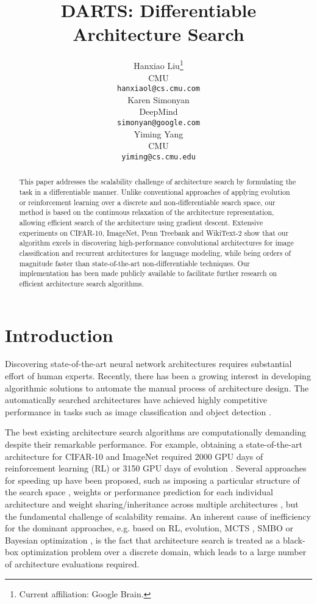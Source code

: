 \documentclass{article}
\title{DARTS: Differentiable Architecture Search}
\author{Hanxiao Liu\thanks{Current affiliation: Google Brain.} \\
  CMU \\
  \texttt{hanxiaol@cs.cmu.com} \\
  \And
  Karen Simonyan \\
  DeepMind \\
  \texttt{simonyan@google.com} \\
   \And
   Yiming Yang \\
   CMU \\
   \texttt{yiming@cs.cmu.edu}
}
\begin{document}
\maketitle

\begin{abstract}
	This paper addresses the scalability challenge of architecture search by formulating the task in a differentiable manner.
	Unlike conventional approaches of applying
	evolution or reinforcement learning over a discrete and non-differentiable search space,
	our method is based on the continuous relaxation of the architecture representation,
	allowing efficient search of the architecture using gradient descent.
	Extensive experiments on CIFAR-10, ImageNet, Penn Treebank and WikiText-2 show that
	our algorithm excels in 
	discovering high-performance convolutional architectures for image classification and recurrent architectures for language modeling,
	while being orders of magnitude faster than state-of-the-art non-differentiable techniques. Our implementation has been made publicly available to facilitate further research on efficient architecture search algorithms.
\end{abstract}

\section{Introduction}
Discovering state-of-the-art neural network architectures requires substantial effort of human experts.
Recently, there has been a growing interest in developing
algorithmic solutions
to automate the manual process of architecture design.
The automatically searched architectures have achieved highly competitive performance in tasks such as image classification \citep{zoph2016neural, zoph2017learning, liu2017hierarchical, liu2017progressive, real2018regularized} and object detection \citep{zoph2017learning}.

The best existing architecture search algorithms are computationally demanding
despite their remarkable performance.
For example,
obtaining a state-of-the-art architecture for CIFAR-10 and ImageNet
required 2000 GPU days of reinforcement learning (RL) \citep{zoph2017learning}
or 3150 GPU days of evolution \citep{real2018regularized}.
Several approaches for speeding up have been proposed,
such as imposing a particular structure of the search space \citep{liu2017hierarchical, liu2017progressive}, weights or performance prediction for each individual architecture \citep{brock2017smash, baker2018accelerating} and weight sharing/inheritance across multiple architectures \citep{elsken2017simple, pham2018efficient, cai2018efficient, bender2018understanding},
but the fundamental challenge of scalability remains.
An inherent cause of inefficiency for the dominant approaches,
e.g. based on RL, evolution, MCTS \citep{negrinho2017deeparchitect}, SMBO \citep{liu2017progressive} or Bayesian optimization \citep{kandasamy2018neural},
is the fact that architecture search is treated as a black-box optimization problem over a discrete domain, which 
leads to a large number of architecture evaluations required.
\end{document}
